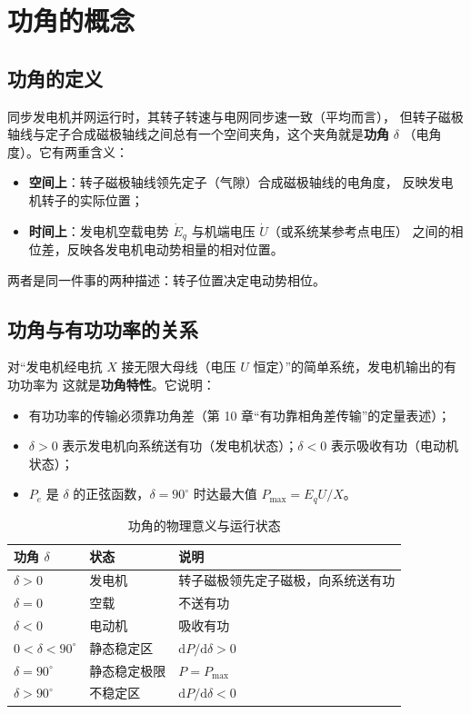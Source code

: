 \section{功角的概念}

\subsection{功角的定义}

同步发电机并网运行时，其转子转速与电网同步速一致（平均而言），
但转子磁极轴线与定子合成磁极轴线之间总有一个空间夹角，这个夹角就是\textbf{功角} $\delta$
（电角度）。它有两重含义：
\begin{itemize}
  \item \textbf{空间上}：转子磁极轴线领先定子（气隙）合成磁极轴线的电角度，
        反映发电机转子的实际位置；
  \item \textbf{时间上}：发电机空载电势 $\dot E_q$ 与机端电压 $\dot U$（或系统某参考点电压）
        之间的相位差，反映各发电机电动势相量的相对位置。
\end{itemize}
两者是同一件事的两种描述：转子位置决定电动势相位。

\subsection{功角与有功功率的关系}

对“发电机经电抗 $X$ 接无限大母线（电压 $U$ 恒定）”的简单系统，发电机输出的有功功率为
这就是\textbf{功角特性}。它说明：
\begin{itemize}
  \item 有功功率的传输必须靠功角差（第 10 章“有功靠相角差传输”的定量表述）；
  \item $\delta>0$ 表示发电机向系统送有功（发电机状态）；$\delta<0$ 表示吸收有功（电动机状态）；
  \item $P_e$ 是 $\delta$ 的正弦函数，$\delta=90^\circ$ 时达最大值 $P_{\max}=E_qU/X$。
\end{itemize}

\begin{table}[htbp]
  \centering
  \caption{功角的物理意义与运行状态}
  \small
  \begin{tabular}{@{}lll@{}}
    \toprule
    功角 $\delta$ & 状态 & 说明 \\
    \midrule
    $\delta>0$ & 发电机 & 转子磁极领先定子磁极，向系统送有功 \\
    $\delta=0$ & 空载 & 不送有功 \\
    $\delta<0$ & 电动机 & 吸收有功 \\
    $0<\delta<90^\circ$ & 静态稳定区 & $\mathrm{d}P/\mathrm{d}\delta>0$ \\
    $\delta=90^\circ$ & 静态稳定极限 & $P=P_{\max}$ \\
    $\delta>90^\circ$ & 不稳定区 & $\mathrm{d}P/\mathrm{d}\delta<0$ \\
    \bottomrule
  \end{tabular}
\end{table}

